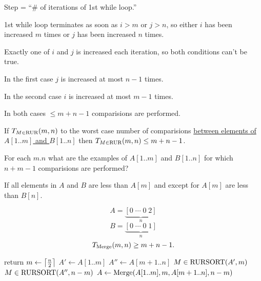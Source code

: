 \documentclass[11pt, cyan, night, 0.5in]{hw}
\begin{document}
\np

Step = ``\# of iterations of 1st while loop.''

1st while loop terminates as soon as $i>m$ or $j>n$, so either $i$ has been increased $m$ times or $j$ has been increased $n$ times.

Exactly one of $i$ and $j$ is increased each iteration, so both conditions can't be true.

In the first case $j$ is increased at most $n-1$ times.

In the second case $i$ is increased at most $m-1$ times.

In both cases $\le m+n-1$ comparisions are performed.

If $T_{M\in\text{RUR}}(m,n)$ to the worst case number of comparisions \underline{between elements of $A[1..m]$ and $B[1..n]$} then $T_{M\in\text{RUR}}(m,n)\le m+n-1$.


For each $m.n$ what are the examples of $A[1..m]$ and $B[1..n]$ for which $n+m-1$ comparisions are performed?

If all elements in $A$ and $B$ are less than $A[m]$ and except for $A[m]$ are less than $B[n]$.

\[A=\underbrace{[0\;\cdots\;0\;2]}_{n}\]
\[B=\underbrace{[0\;\cdots\;0\;1]}_{n}\]
\[T_{\text{Merge}}(m,n)\geq m+n-1.\]

\begin{algorithm}
    \begin{algorithmic}
         
         
            \as return
        \aeif
        \as $m\gets \left\lceil\frac{n}{2}\right\rceil$
        \as $A'\gets A[1..m]$
        \as $A''\gets A[m+1..n]$
        \as $M\in \text{RURSORT}(A', m)$
        \as $M\in \text{RURSORT}(A'', n-m)$
        \as $A\gets \text{Merge}(A[1..m],m,A[m+1..n],n-m)$
        \aefunc
    \end{algorithmic}
\end{algorithm}

\end{document}
